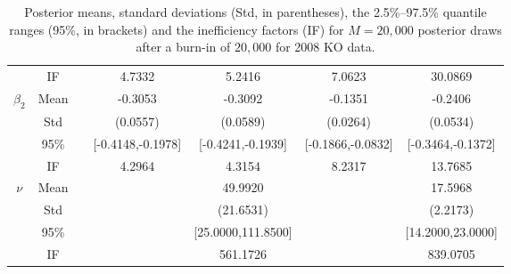 \begin{table}
\begin{footnotesize}
\begin{singlespace}
\begin{tabular}{ccc cccc }
 & IF  &  &  4.7332  &  5.2416  &  7.0623  &  30.0869  \\ [1.0ex] 
 $\beta_2$   & Mean   &  &  -0.3053  &  -0.3092  &  -0.1351  &  -0.2406  \\  
 & Std   &  &  (0.0557)  &  (0.0589)  &  (0.0264)  &  (0.0534)  \\  
 & 95\%  &  &  [-0.4148,-0.1978]  &  [-0.4241,-0.1939]  &  [-0.1866,-0.0832]  &  [-0.3464,-0.1372]  \\  
 & IF  &  &  4.2964  &  4.3154  &  8.2317  &  13.7685  \\ [1.0ex] 
 $\nu$   & Mean   &  &   &  49.9920  &   &  17.5968  \\  
 & Std   &  &    &  (21.6531)  &    &  (2.2173)  \\  
 & 95\%  &  &    &  [25.0000,111.8500]  &  &  [14.2000,23.0000]  \\  
 & IF  &  &    &  561.1726  &    &  839.0705  \\ [1.0ex] 
\bottomrule 
\end{tabular}
\end{singlespace}
\end{footnotesize}
\caption{Posterior means, standard deviations (Std, in parentheses), 
the 2.5\%--97.5\% quantile ranges (95\%, in brackets) and  the inefficiency factors (IF)  for $M=20,000$ posterior draws after a burn-in of $20,000$ 
for 2008 KO data.}
\label{tab:sim_res_2008_KO} 
\end{table}
